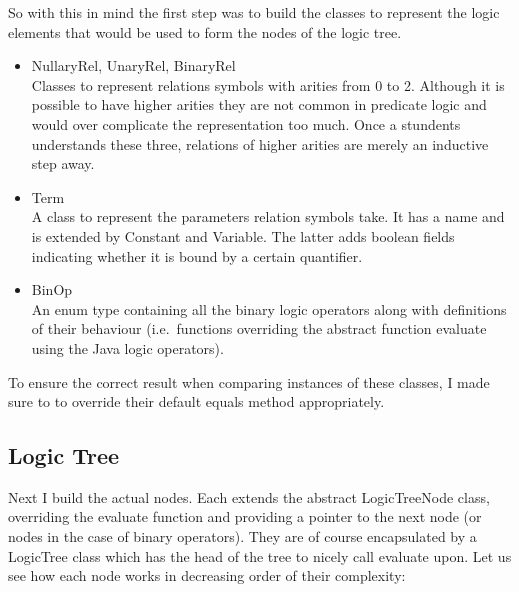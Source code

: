 \documentclass{report}
\begin{document}
\noindent So with this in mind the first step was to build the classes to 
represent the logic elements that would be used to form the nodes of the logic 
tree.

  \begin{itemize}
  \item NullaryRel, UnaryRel, BinaryRel \\
  Classes to represent relations symbols with arities from 0 to 2. Although it 
  is possible to have higher arities they are not common in predicate logic and 
  would over complicate the representation too much. Once a stundents 
  understands these three, relations of higher arities are merely an inductive 
  step away.
  \item Term \\
  A class to represent the parameters relation symbols take. It has a name and 
  is extended by Constant and Variable. The latter adds boolean fields 
  indicating whether it is bound by a certain quantifier. 
  \item BinOp \\
  An enum type containing all the binary logic operators along with definitions 
  of their behaviour (i.e.\ functions overriding the abstract function evaluate 
  using the Java logic operators).
  \end{itemize}

\noindent To ensure the correct result when comparing instances of these 
classes, I made sure to to override their default equals method appropriately. 

\subsection{Logic Tree}
Next I build the actual nodes. Each extends the abstract LogicTreeNode class, 
overriding the evaluate function and providing a pointer to the next node (or 
nodes in the case of binary operators). They are of course encapsulated by a 
LogicTree class which has the head of the tree to nicely call evaluate upon. 
Let us see how each node works in decreasing order of their complexity:
\end{document}
